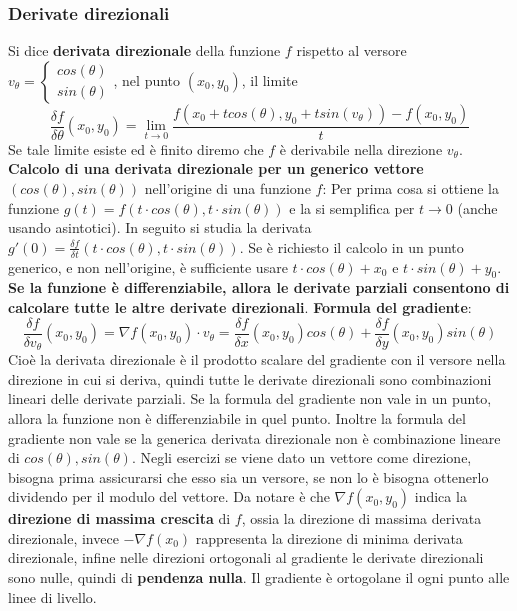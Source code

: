 \subsubsection{Derivate direzionali}
Si dice \textbf{derivata direzionale} della funzione $f$ rispetto al versore $v_\theta = \begin{cases}
    cos(\theta)\\ sin(\theta)
\end{cases}$, nel punto $(x_0,y_0)$, il limite
\[
    \frac{\delta f}{\delta \theta}(x_0,y_0) = \lim_{t\rightarrow 0}\frac{f(x_0 + t cos(\theta), y_0 + t sin(v_\theta)) - f(x_0,y_0)}{t}
\]
Se tale limite esiste ed è finito diremo che $f$ è derivabile nella direzione $v_\theta$.\newline
\newline
\textbf{Calcolo di una derivata direzionale per un generico vettore} $(cos(\theta), sin(\theta))$ nell'origine di una funzione $f$: Per prima cosa si ottiene la funzione $g(t) = f(t \cdot cos(\theta), t \cdot sin(\theta))$ e la si semplifica per $t \rightarrow 0$ (anche usando asintotici). In seguito si studia la derivata $g'(0) = \frac{\delta f}{\delta t}(t \cdot cos(\theta), t \cdot sin(\theta))$.\newline
Se è richiesto il calcolo in un punto generico, e non nell'origine, è sufficiente usare $t \cdot cos(\theta) + x_0$ e $t \cdot sin(\theta) + y_0$. \newline
\newline
\textbf{Se la funzione è differenziabile, allora le derivate parziali consentono di calcolare tutte le altre derivate direzionali}.\newline
\newline
\textbf{Formula del gradiente}: 
\[
    \frac{\delta f}{\delta v_\theta}(x_0,y_0) = \nabla f(x_0,y_0) \cdot v_\theta = \frac{\delta f}{\delta x} (x_0,y_0)cos(\theta) + \frac{\delta f}{\delta y}(x_0, y_0) sin(\theta)
\]
Cioè la derivata direzionale è il prodotto scalare del gradiente con il versore nella direzione in cui si deriva, quindi tutte le derivate direzionali sono combinazioni lineari delle derivate parziali.\newline
Se la formula del gradiente non vale in un punto, allora la funzione non è differenziabile in quel punto.\newline
Inoltre la formula del gradiente non vale se la generica derivata direzionale non è combinazione lineare di $cos(\theta), sin(\theta)$.\newline
\newline
Negli esercizi se viene dato un vettore come direzione, bisogna prima assicurarsi che esso sia un versore, se non lo è bisogna ottenerlo dividendo per il modulo del vettore.\newline
\newline
Da notare è che $\nabla f(x_0,y_0)$ indica la \textbf{direzione di massima crescita} di $f$, ossia la direzione di massima derivata direzionale, invece $-\nabla f(x_0)$ rappresenta la direzione di minima derivata direzionale, infine nelle direzioni ortogonali al gradiente le derivate direzionali sono nulle, quindi di \textbf{pendenza nulla}.\newline
\newline
Il gradiente è ortogolane il ogni punto alle linee di livello.
